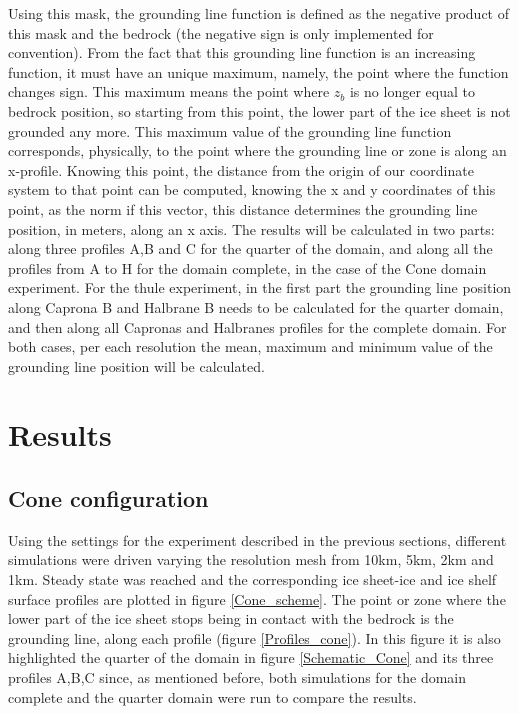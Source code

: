 \documentclass{article}
\begin{document}
Using this mask, the grounding line function is defined as the negative product of this mask and the bedrock (the negative sign is only implemented for convention). From the fact that this grounding line function is an increasing function, it must have an unique maximum, namely, the point where the function changes sign. This maximum means the point where $z_b$ is no longer equal to bedrock position, so starting from this point, the lower part of the ice sheet is not grounded any more. This maximum value of the grounding line function corresponds, physically, to the point where the grounding line or zone is along an x-profile. Knowing this point, the distance from the origin of our coordinate system to that point can be computed, knowing the x and y coordinates of this point, as the norm if this vector, this distance determines the grounding line position, in meters, along an x axis. The results will be calculated in two parts: along three profiles A,B and C for the quarter of the domain, and along all the profiles from A to H for the domain complete, in the case of the Cone domain experiment. For the thule experiment, in the first part the grounding line position along Caprona B and Halbrane B needs to be calculated for the quarter domain, and then along all Capronas and Halbranes profiles for the complete domain. For both cases, per each resolution the mean, maximum and minimum value of the grounding line position will be calculated.

\section{Results}
\subsection{Cone configuration}

Using the settings for the experiment described in the previous sections, different simulations were driven varying the resolution mesh from 10km, 5km, 2km and 1km. Steady state was reached and the corresponding ice sheet-ice and ice shelf surface profiles are plotted in figure \ref{Cone_scheme}. The point or zone where the lower part of the ice sheet stops being in contact with the bedrock is the grounding line, along each profile (figure \ref{Profiles_cone}). In this figure it is also highlighted the quarter of the domain in figure \ref{Schematic_Cone} and its three profiles A,B,C since, as mentioned before, both simulations for the domain complete and the quarter domain were run to compare the results. 
\end{document}
